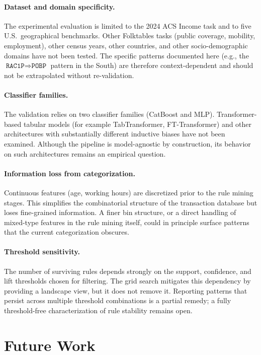 \paragraph{Dataset and domain specificity.} The experimental evaluation is limited to the 2024 ACS Income task and to five U.S.\ geographical benchmarks. Other Folktables tasks (public coverage, mobility, employment), other census years, other countries, and other socio-demographic domains have not been tested. The specific patterns documented here (e.g., the $\texttt{RAC1P} \Rightarrow \texttt{POBP}$ pattern in the South) are therefore context-dependent and should not be extrapolated without re-validation.

\paragraph{Classifier families.} The validation relies on two classifier families (CatBoost and MLP). Transformer-based tabular models (for example TabTransformer, FT-Transformer) and other architectures with substantially different inductive biases have not been examined. Although the pipeline is model-agnostic by construction, its behavior on such architectures remains an empirical question.

\paragraph{Information loss from categorization.} Continuous features (age, working hours) are discretized prior to the rule mining stages. This simplifies the combinatorial structure of the transaction database but loses fine-grained information. A finer bin structure, or a direct handling of mixed-type features in the rule mining itself, could in principle surface patterns that the current categorization obscures.

\paragraph{Threshold sensitivity.} The number of surviving rules depends strongly on the support, confidence, and lift thresholds chosen for filtering. The grid search mitigates this dependency by providing a landscape view, but it does not remove it. Reporting patterns that persist across multiple threshold combinations is a partial remedy; a fully threshold-free characterization of rule stability remains open.

\section{Future Work}
\label{sec:conclusions-future}

